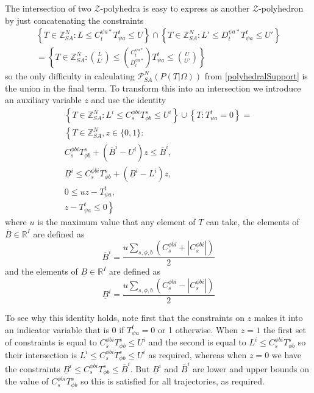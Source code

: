 \documentclass{article}
\begin{document}
The intersection of two $\mathcal{Z}$-polyhedra is easy to express as another $\mathcal{Z}$-polyhedron by just concatenating the constraints
\begin{multline}
\left\{ T\in\mathbb{\mathbb{Z}}^N_{SA} : L \le C^{\psi a*}_{t} T^t_{\psi a} \le U \right\}
\cap \left\{ T\in\mathbb{\mathbb{Z}}^N_{SA} : L' \le D^{\psi a *}_{t} T^t_{\psi a} \le U' \right\} \\
= \left\{ T\in\mathbb{\mathbb{Z}}^N_{SA} : {L \choose L'}  \le  {C^{\psi a*}_t \choose D^{\psi a*}_t} T^t_{\psi a} \le {U \choose U'} \right\}
\label{intersection}
\end{multline}
so the only difficulty in calculating $\mathcal{P}^N_{SA}(P(T|\Omega))$ from \eqref{polyhedralSupport} is the union in the final term. To transform this into an intersection we introduce an auxiliary variable $z$ and use the identity
\begin{multline}
\left\{ T\in\mathbb{Z}^N_{SA} : L^i \le C^{\phi bi}_{s} T^s_{\phi b} \le U^i \right\}
\cup
\left\{T: T^t_{\psi a} = 0\right\}
=\\
\left\{
T\in\mathbb{Z}^N_{SA}, z\in\{0,1\}:\right.\\
C^{\phi b i}_{s} T^s_{\phi b} + (\overline{B}^i-U^i)z \le \overline{B}^i,\\
\underline{B}^i \le C^{\phi b i}_{s} T^s_{\phi b} + (\underline{B}^i-L^i)z,\\
0 \le uz - T^t_{\psi a},\\
\left. z - T^t_{\psi a} \le 0
\right\}
\label{implication}
\end{multline}
where $u$ is the maximum value that any element of $T$ can take, the elements of $\overline{B}\in\mathbb{R}^I$ are defined as
\[
\overline{B}^i = \frac{u\sum_{s,\phi,b} \left( C^{\phi bi}_{s} + \left|C^{\phi bi}_{s}\right|\right)}{2}
\]
and the elements of $\underline{B}\in\mathbb{R}^I$ are defined as
\[
\underline{B}^i = \frac{u\sum_{s,\phi,b} \left(C^{\phi bi}_{s} - \left|C^{\phi bi}_{s}\right|\right)}{2}
\]

To see why this identity holds, note first that the constraints on $z$ makes it into an indicator variable that is 0 if $T^t_{\psi a}=0$ or 1 otherwise. When $z=1$ the first set of constraints is equal to $C^{\phi bi}_{s} T^s_{\phi b} \le U^i$ and the second is equal to $L^i \le C^{\phi bi}_{s} T^s_{\phi b}$ so their intersection is $L^i \le  C^{\phi bi}_{s} T^s_{\phi b} \le U^i$ as required, whereas when $z=0$ we have the constraints $\underline{B}^i \le C^{\phi bi}_{s} T^s_{\phi b} \le \overline{B}^i$. But $\underline{B}^i$ and $\overline{B}^i$ are lower and upper bounds on the value of $C^{\phi bi}_{s} T^s_{\phi b}$ so this is satisfied for all trajectories, as required.
\end{document}
